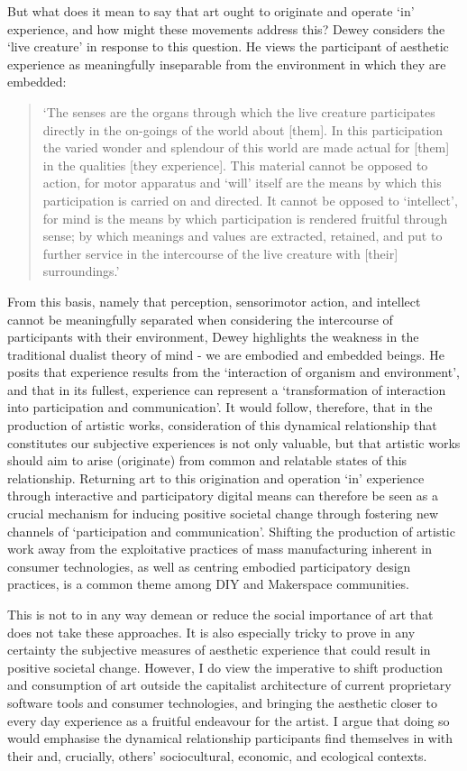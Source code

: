 But what does it mean to say that art ought to originate and operate `in' experience, and how might these movements address this? Dewey considers the `live creature' in response to this question. He views the participant of aesthetic experience as meaningfully inseparable from the environment in which they are embedded: 
\begin{quote}
    `The senses are the organs through which the live creature participates directly in the on-goings of the world about [them]. In this participation the varied wonder and splendour of this world are made actual for [them] in the qualities [they experience]. This material cannot be opposed to action, for motor apparatus and `will' itself are the means by which this participation is carried on and directed. It cannot be opposed to `intellect', for mind is the means by which participation is rendered fruitful through sense; by which meanings and values are extracted, retained, and put to further service in the intercourse of the live creature with [their] surroundings.' \citeyearpar[p. 22]{dewey1934}
\end{quote}
From this basis, namely that perception, sensorimotor action, and intellect cannot be meaningfully separated when considering the intercourse of participants with their environment, Dewey highlights the weakness in the traditional dualist theory of mind - we are embodied and embedded beings. He posits that experience results from the `interaction of organism and environment',  and that in its fullest, experience can represent a `transformation of interaction into participation and communication'. It would follow, therefore, that in the production of artistic works, consideration of this dynamical relationship that constitutes our subjective experiences is not only valuable, but that artistic works should aim to arise (originate) from common and relatable states of this relationship. Returning art to this origination and operation `in' experience through interactive and participatory digital means can therefore be seen as a crucial mechanism for inducing positive societal change through fostering new channels of `participation and communication'. Shifting the production of artistic work away from the exploitative practices of mass manufacturing inherent in consumer technologies, as well as centring embodied participatory design practices, is a common theme among DIY and Makerspace communities.

This is not to in any way demean or reduce the social importance of art that does not take these approaches. It is also especially tricky to prove in any certainty the subjective measures of aesthetic experience that could result in positive societal change. However, I do view the imperative to shift production and consumption of art outside the capitalist architecture of current proprietary software tools and consumer technologies, and bringing the aesthetic closer to every day experience as a fruitful endeavour for the artist. I argue that doing so would emphasise the dynamical relationship participants find themselves in with their and, crucially, others' sociocultural, economic, and ecological contexts.

